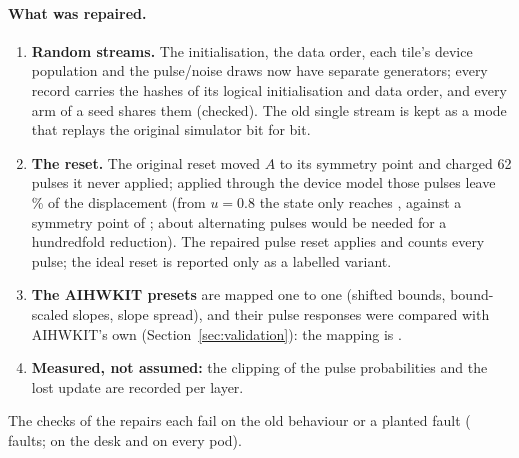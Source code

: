 \paragraph{What was repaired.}
\begin{enumerate}
\item \textbf{Random streams.} The initialisation, the data order, each tile's device population and the pulse/noise draws now
      have separate generators; every record carries the hashes of its logical initialisation and data order, and every arm
      of a seed shares them (checked). The old single stream is kept as a mode that replays the original simulator bit for bit.
\item \textbf{The reset.} The original reset moved $A$ to its symmetry point and charged 62 pulses it never applied; applied
      through the device model those pulses leave \RVresetResidPct\,\% of the displacement (from $u=0.8$ the state only reaches
      \RVresetAfter, against a symmetry point of \RVresetSp; about \RVresetPulsesHundredfold{} alternating pulses would be needed
      for a hundredfold reduction). The repaired pulse reset applies and counts every pulse; the ideal reset is reported only
      as a labelled variant.
\item \textbf{The AIHWKIT presets} are mapped one to one (shifted bounds, bound-scaled slopes, slope spread), and their pulse
      responses were compared with AIHWKIT's own (Section~\ref{sec:validation}): the mapping is \RVaihwAccepted.
\item \textbf{Measured, not assumed:} the clipping of the pulse probabilities and the lost update are recorded per layer.
\end{enumerate}
The \RVnChecks{} checks of the repairs each fail on the old behaviour or a planted fault (\RVnFaults{} faults; \RVtestsAllOk{}
on the desk and on every pod).

